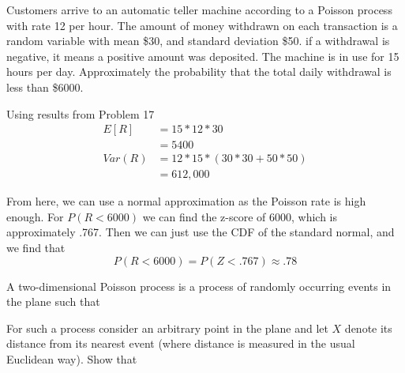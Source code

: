 \documentclass[10pt,a4paper]{exam}
\begin{document}
\begin{questions}
\question Customers arrive to an automatic teller machine according to a Poisson process with rate 12 per hour. The amount of money withdrawn on each transaction is a random variable with mean \$30, and standard deviation \$50. if a withdrawal is negative, it means a positive amount was deposited. The machine is in use for 15 hours per day. Approximately the probability that the total daily withdrawal is less than \$6000.

\begin{solution}
Using results from Problem 17
\begin{align*}
E[R]		&= 		15*12*30\\
			&= 		5400\\
Var(R)	&= 		12*15*(30*30 + 50*50)\\
			&= 		612,000
\end{align*}

From here, we can use a normal approximation as the Poisson rate is high enough. For $P(R < 6000)$ we can find the z-score of 6000, which is approximately .767. Then we can just use the CDF of the standard normal, and we find that
$$P(R < 6000) = P(Z < .767) \approx .78$$
\end{solution}
\pagebreak
\question A two-dimensional Poisson process is a process of randomly occurring events in the plane such that

For such a process consider an arbitrary point in the plane and let $X$ denote its distance from its nearest event (where distance is measured in the usual Euclidean way). Show that
\end{questions}
\end{document}

